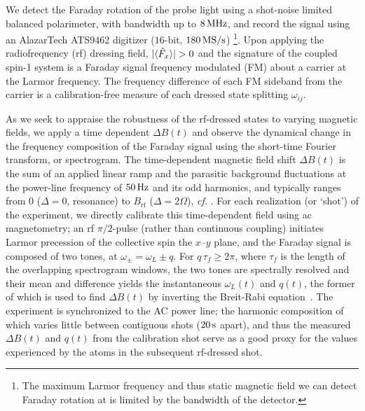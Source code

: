 \documentclass[aps,prl,reprint,superscriptaddress,floatfix]{revtex4-1}
\begin{document}
We detect the Faraday rotation of the probe light using a shot-noise limited balanced polarimeter, with bandwidth up to $\unit[8]{MHz}$, and record the signal using an AlazarTech \textsc{ATS9462} digitizer ($16$-bit, $\unit[180]{MS/s}$)
\footnote{The maximum Larmor frequency and thus static magnetic field we can detect Faraday rotation at is limited by the bandwidth of the detector.}.
Upon applying the radiofrequency (rf) dressing field, $\vert \langle \hat{F}_x \rangle \vert  > 0$ and the signature of the coupled spin-1 system is a Faraday signal frequency modulated (FM) about a carrier at the Larmor frequency.
The frequency difference of each FM sideband from the carrier is a calibration-free measure of each dressed state splitting $\omega_{ij}$.

As we seek to appraise the robustness of the rf-dressed states to varying magnetic fields, we apply a time dependent $\Delta B(t)$ and observe the dynamical change in the frequency composition of the Faraday signal using the short-time Fourier transform, or spectrogram.
The time-dependent magnetic field shift $\Delta B(t)$ is the sum of an applied linear ramp and the parasitic background fluctuations at the power-line frequency of $\unit[50]{Hz}$ and its odd harmonics, and typically ranges from $0$ ($\Delta = 0$, resonance) to $B_{\text{rf}}$ ($\Delta = 2\Omega$), \textit{cf.} .
For each realization (or `shot') of the experiment, we directly calibrate this time-dependent field using ac magnetometry; an rf $\pi/2$-pulse (rather than continuous coupling) initiates Larmor precession of the collective spin the $x$--$y$ plane, and the Faraday signal is composed of two tones, at $\omega_\pm = \omega_L \pm q$.
For $q \, \tau_f \geq 2\pi$, where $\tau_f$ is the length of the overlapping spectrogram windows, the two tones are spectrally resolved and their mean and difference yields the instantaneous $\omega_L(t)$ and $q(t)$, the former of which is used to find $\Delta B(t)$ by inverting the Breit-Rabi equation~\cite{ramsey_molecular_1956}. 
The experiment is synchronized to the AC power line; the harmonic composition of which varies little between contiguous shots ($\unit[20]{s}$ apart), and thus the measured $\Delta B(t)$ and $q(t)$ from the calibration  shot serve as a good proxy for the values experienced by the atoms in the subsequent rf-dressed shot.
\end{document}
